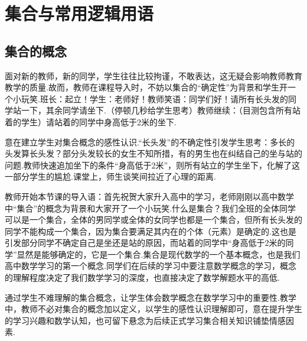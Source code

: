 \chapter{集合与常用逻辑用语}
\section{集合的概念}
\begin{intro}
面对新的教师，新的同学，学生往往比较拘谨，不敢表达，这无疑会影响教师教育教学的质量.故而，教师在课程导入时，不妨以集合的“确定性”为背景和学生开一个小玩笑.班长：起立！学生：老师好！教师笑语：同学们好！请所有长头发的同学站一下，其余同学请坐下.（停顿几秒给学生思考）教师继续：（目测包含所有站着的学生）请站着的同学中身高低于2米的坐下.
\end{intro}
\begin{purpose}
意在建立学生对集合概念的感性认识.“长头发”的不确定性引发学生思考：多长的头发算长头发？部分头发较长的女生不知所措，有的男生也在纠结自己的坐与站的问题.教师快速追加坐下的条件“身高低于2米”，则所有站立的学生坐下，化解了这一部分学生的尴尬.课堂上，师生谈笑间拉近了心理的距离.
\end{purpose}

\begin{intro}
    教师开始本节课的导入语：首先祝贺大家升入高中的学习，老师刚刚以高中数学中“集合”的概念为背景和大家开了一个小玩笑.什么是集合？我们全班的全体同学可以是一个集合，全体的男同学或全体的女同学也都是一个集合，但所有长头发的同学不能构成一个集合，因为集合要满足其内在的个体（元素）是确定的.这也是引发部分同学不确定自己是坐还是站的原因，而站着的同学中“身高低于2米的同学”显然是能够确定的，它是一个集合.集合是现代数学的一个基本概念，也是我们高中数学学习的第一个概念.同学们在后续的学习中要注意数学概念的学习，概念的理解程度决定了我们数学学习的深度，也直接决定了数学解题水平的高低.
\end{intro}
\begin{purpose}
通过学生不难理解的集合概念，让学生体会数学概念在数学学习中的重要性.教学中，教师不必对集合的概念加以定义，以学生的感性认识理解即可，意在提升学生的学习兴趣和数学认知，也可留下悬念为后续正式学习集合相关知识铺垫情感因素.
\end{purpose}